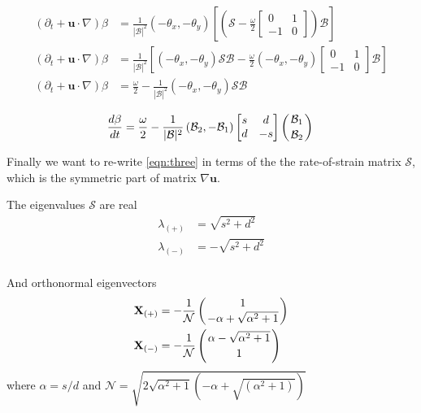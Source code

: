 \begin{align*}
 \left(\partial_{t} + \mathbf{u} \cdot \nabla \right) \beta &= \frac{1}{|\mathcal{B}|^{2}} \left( -\theta_{x}, -\theta_{y} \right) \left[\left( \mathcal{S} - \frac{\omega}{2}      
      \begin{bmatrix}
	0 & 1 \\
	-1 & 0 
      \end{bmatrix}  \right)\mathcal{B} \right] \\
 \left(\partial_{t} + \mathbf{u} \cdot \nabla \right) \beta &= \frac{1}{|\mathcal{B}|^{2}} \left[ \left( -\theta_{x}, -\theta_{y} \right) \mathcal{S} \mathcal{B}  - \frac{\omega}{2} \left( -\theta_{x}, -\theta_{y} \right)
      \begin{bmatrix}
	0 & 1 \\
	-1 & 0 
      \end{bmatrix}  \mathcal{B} \right] \\
  \left(\partial_{t} + \mathbf{u} \cdot \nabla \right) \beta &= \frac{\omega}{2} - \frac{1}{|\mathcal{B}|^{2}} \left( -\theta_{x}, -\theta_{y} \right) \mathcal{S} \mathcal{B}  \\
\end{align*}
\begin{equation}
  \label{eqn:four}
  \frac{d\beta}{dt} = \frac{\omega}{2} - \frac{1}{|\mathcal{B}|^{2}} \left( \mathcal{B}_{2}, -\mathcal{B}_{1} \right) \begin{bmatrix}
	s & d \\
	d & -s
      \end{bmatrix} \left(\mathcal{B}_{1} \atop \mathcal{B}_{2} \right)  \\
\end{equation}

Finally we want to re-write \ref{eqn:three} in terms of the the rate-of-strain matrix $\mathcal{S}$, which is the symmetric part of matrix $\nabla \mathbf{u}$.

The eigenvalues $\mathcal{S}$ are real 
\begin{align*}
 \lambda_{(+)} &= \sqrt{s^{2} + d^{2}} \\
 \lambda_{(-)} &= - \sqrt{s^{2} + d^{2}} \\
\end{align*}

And orthonormal eigenvectors 
\begin{align*}
 \mathbf{X}_{(+)} &= -\frac{1}{\mathcal{N}} \left( 1 \atop -\alpha + \sqrt{\alpha^{2} + 1} \right)  \\
 \mathbf{X}_{(-)} &= -\frac{1}{\mathcal{N}} \left( \alpha - \sqrt{\alpha^{2} + 1} \atop  1 \right)  \\
\end{align*}
where $\alpha=s/d$ and $\mathcal{N} = \sqrt{2\sqrt{\alpha^2 +1}\left( -\alpha + \sqrt{(\alpha^2 + 1)} \right)}$


